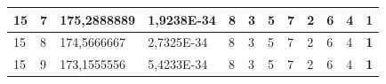\documentclass[conference]{IEEEtran}
\begin{document}
\begin{table}[]
\begin{tabular}{|llll|llllllll|}
\multicolumn{1}{|l|}{15}                                                             & \multicolumn{1}{l|}{7}                                                                 & \multicolumn{1}{l|}{175,2888889}                                                           & 1,9238E-34                              & \multicolumn{1}{l|}{8}                                                           & \multicolumn{1}{l|}{3}                                                           & \multicolumn{1}{l|}{5}                                                           & \multicolumn{1}{l|}{7}                                                           & \multicolumn{1}{l|}{2}                                                           & \multicolumn{1}{l|}{6}                                                           & \multicolumn{1}{l|}{4}                                                           & \textbf{1}                          \\ \hline
\multicolumn{1}{|l|}{15}                                                             & \multicolumn{1}{l|}{8}                                                                 & \multicolumn{1}{l|}{174,5666667}                                                           & 2,7325E-34                              & \multicolumn{1}{l|}{8}                                                           & \multicolumn{1}{l|}{3}                                                           & \multicolumn{1}{l|}{5}                                                           & \multicolumn{1}{l|}{7}                                                           & \multicolumn{1}{l|}{2}                                                           & \multicolumn{1}{l|}{6}                                                           & \multicolumn{1}{l|}{4}                                                           & \textbf{1}                          \\ \hline
\multicolumn{1}{|l|}{15}                                                             & \multicolumn{1}{l|}{9}                                                                 & \multicolumn{1}{l|}{173,1555556}                                                           & 5,4233E-34                              & \multicolumn{1}{l|}{8}                                                           & \multicolumn{1}{l|}{3}                                                           & \multicolumn{1}{l|}{5}                                                           & \multicolumn{1}{l|}{7}                                                           & \multicolumn{1}{l|}{2}                                                           & \multicolumn{1}{l|}{6}                                                           & \multicolumn{1}{l|}{4}                                                           & \textbf{1}                          \\ \hline

\end{tabular}
\end{table}
\end{document}
